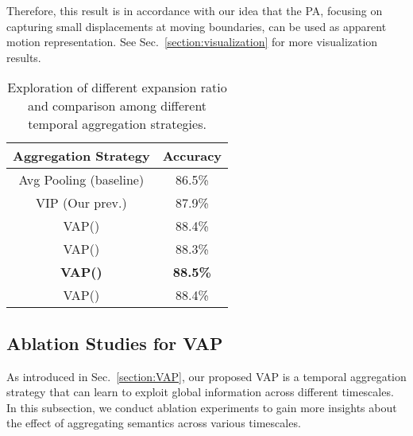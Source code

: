 \documentclass[journal]{IEEEtran}
\begin{document}
Therefore, this result is in accordance with our idea that the PA, focusing on capturing small displacements at moving boundaries, can be used as apparent motion representation. See Sec.~\ref{section:visualization} for more visualization results.









\begin{table}[t]
\caption{Exploration of different expansion ratio  and comparison among different temporal aggregation strategies.}
\label{table:AP_VIP_VAP}
\begin{center}
\begin{tabular}{cc}
\toprule
\textbf{Aggregation Strategy} & \textbf{Accuracy}\\
\midrule
Avg Pooling (baseline) & 86.5\% \\
\midrule
VIP \cite{Zhang2019PANPA} (Our prev.) & 87.9\% \\
\midrule
VAP() & 88.4\% \\
VAP() & 88.3\% \\
\textbf{VAP()} & \textbf{88.5\%} \\
VAP() & 88.4\% \\
\bottomrule
\end{tabular}
\end{center}
\end{table}






\subsection{Ablation Studies for VAP} \label{section:VAP_ablation}

As introduced in Sec.~\ref{section:VAP}, our proposed VAP is a temporal aggregation strategy that can learn to exploit global information across different timescales. In this subsection, we conduct ablation experiments to gain more insights about the effect of aggregating semantics across various timescales.
\end{document}
